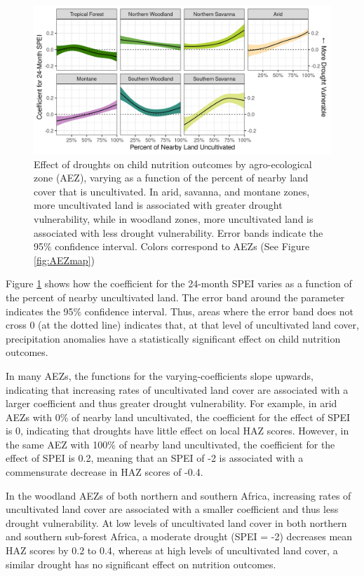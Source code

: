 \documentclass{article}
\begin{document}
\begin{figure}[h!]
	\begin{center}
	\includegraphics[width=\linewidth]{AEZ_effects.png}
	\end{center}
  \caption{Effect of droughts on child nutrition outcomes by agro-ecological zone (AEZ), varying as a function of the percent of nearby land cover that is uncultivated.  In arid, savanna, and montane zones, more uncultivated land is associated with greater drought vulnerability, while in woodland zones, more uncultivated land is associated with less drought vulnerability.  Error bands indicate the 95\% confidence interval. Colors correspond to AEZs (See Figure \ref{fig:AEZmap})}
	\label{fig:naturaleffect}
\end{figure}

Figure \ref{fig:naturaleffect} shows how the coefficient for the 24-month SPEI varies as a function of the percent of nearby uncultivated land.  The error band around the parameter indicates the 95\% confidence interval.  Thus, areas where the error band does not cross 0 (at the dotted line) indicates that, at that level of uncultivated land cover, precipitation anomalies have a statistically significant effect on child nutrition outcomes.

In many AEZs, the functions for the varying-coefficients slope upwards, indicating that increasing rates of uncultivated land cover are associated with a larger coefficient and thus greater drought vulnerability. For example, in arid AEZs with 0\% of nearby land uncultivated, the coefficient for the effect of SPEI is 0, indicating that droughts have little effect on local HAZ scores.  However, in the same AEZ with 100\% of nearby land uncultivated, the coefficient for the effect of SPEI is 0.2, meaning that an SPEI of -2 is associated with a commensurate decrease in HAZ scores of -0.4.

In the woodland AEZs of both northern and southern Africa, increasing rates of uncultivated land cover are associated with a smaller coefficient and thus less drought vulnerability.  At low levels of uncultivated land cover in both northern and southern sub-forest Africa, a moderate drought (SPEI = -2) decreases mean HAZ scores by 0.2 to 0.4, whereas at high levels of uncultivated land cover, a similar drought has no significant effect on nutrition outcomes.
\end{document}
